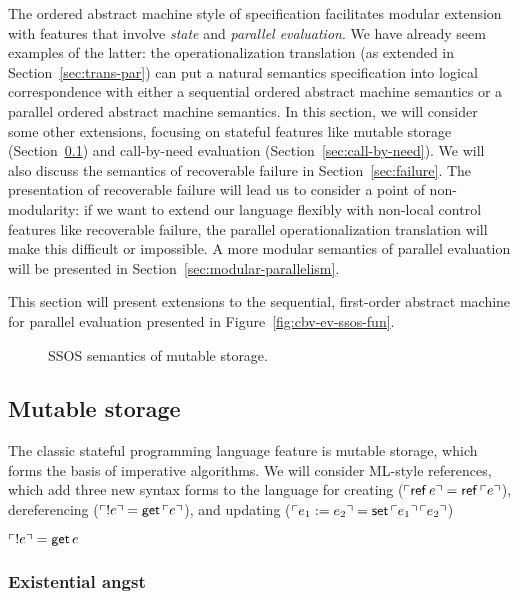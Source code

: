 The ordered abstract machine style of specification facilitates
modular extension with features that involve {\it state} and {\it
  parallel evaluation}. We have already seem examples of the latter:
the operationalization translation (as extended in
Section~\ref{sec:trans-par}) can put a natural semantics specification
into logical correspondence with either a sequential ordered abstract
machine semantics or a parallel ordered abstract machine semantics. In
this section, we will consider some other extensions, focusing on
stateful features like mutable storage
(Section~\ref{sec:mutable-storage}) and call-by-need evaluation
(Section~\ref{sec:call-by-need}). We will also discuss the semantics
of recoverable failure in Section~\ref{sec:failure}. The presentation
of recoverable failure will lead us to consider a point of
non-modularity: if we want to extend our language flexibly with
non-local control features like recoverable failure, the parallel
operationalization translation will make this difficult or impossible.
A more modular semantics of parallel evaluation will be presented in
Section~\ref{sec:modular-parallelism}.

This section will present extensions to the sequential, first-order
abstract machine for parallel evaluation presented in
Figure~\ref{fig:cbv-ev-ssos-fun}.

\begin{figure}[t]
\caption{SSOS semantics of mutable storage.}
\label{fig:ssos-mutable}
\end{figure}

\subsection{Mutable storage}
\label{sec:mutable-storage}

The classic stateful programming language feature is mutable storage,
which forms the basis of imperative algorithms. We will consider
ML-style references, which add three new syntax forms to the language
for creating (${\ulcorner{{\sf ref}\,e}\urcorner} = {\sf ref}\,{\ulcorner{e}\urcorner}$),
dereferencing (${\ulcorner{{!}e}\urcorner} = {\sf get}\,{\ulcorner{e}\urcorner}$), and updating
(${\ulcorner{e_1 := e_2}\urcorner} = {\sf set}\,{\ulcorner{e_1}\urcorner}\,{\ulcorner{e_2}\urcorner}$)

${\ulcorner{{!}e}\urcorner} = {\sf get}\,e$


\subsubsection{Existential angst} 


